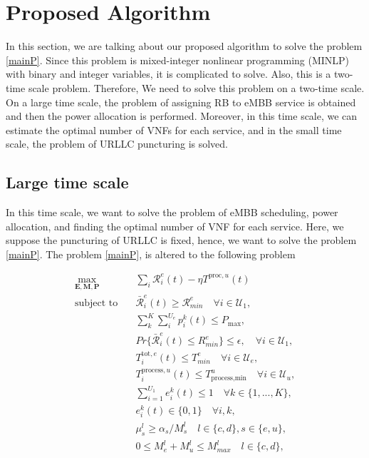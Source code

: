 \documentclass[conference]{IEEEtran}
\begin{document}
\section{Proposed Algorithm}
In this section, we are talking about our proposed algorithm to solve the problem \eqref{mainP}.
Since this problem is mixed-integer nonlinear programming (MINLP) with binary and integer variables, it is complicated to solve. Also, this is a two-time scale problem.
Therefore, We need to solve this problem on a two-time scale. On a large time scale, the problem of assigning RB to eMBB service is obtained and then the power allocation is performed. 
Moreover, in this time scale, we can estimate the optimal number of VNFs for each service, and in the small time scale, the problem of URLLC puncturing is solved. 
\subsection{Large time scale}
In this time scale, we want to solve the problem of eMBB scheduling, power allocation, and finding the optimal number of VNF for each service.
Here, we suppose the puncturing of URLLC is fixed, hence, we want to solve the problem \eqref{mainP}.
The problem \eqref{mainP}, is altered to the following problem


\begin{subequations} \label{mainP1}
\begin{alignat}{4}
\max\limits_{ \boldsymbol{E},\boldsymbol{M}, \boldsymbol{P}} &  \sum_i {\mathcal{R}}_{i}^e(t) - \eta T^{\text{proc}, u}(t)       \ \\
\text{subject to} \quad  & \bar{\mathcal{R}}_{i}^e(t) \geq  \mathcal{R}_{min}^e \quad \forall i \in \mathcal{U}_1, \label{p11} \\
& \sum_k^K \sum_i^{U_e} p^k_i(t) \leq P_{\text{max}},  \label{p11-1} \\
& Pr\{\bar{\mathcal{R}}_{i}^e(t) \leq {R}_{min}^e\}  \leq \epsilon,\quad \forall i \in \mathcal{U}_1, \label{p12}\\
&T^{\text{tot}, e}_i(t)  \leq T_{min}^e  \quad \forall i \in \mathcal{U}_e, \label{p12-1} \\
&T^{\text{process}, u}_i(t)  \leq T_{\text{process,min}}^u  \quad \forall i \in \mathcal{U}_u, \label{p12-2} \\
&\sum_{i=1}^{U_1}e^k_i(t)\leq 1 \quad \forall k \in \{1,...,K\},\label{p15} \\
&e^k_i(t)\in \{0,1\}  \quad \forall i,k, \label{p16} \\
& \mu^l_s \geq \alpha_s/M^l_s \quad l \in \{c,d\}, s\in\{e,u\},\label{p18} \\
& 0 \leq M^l_e  + M^l_u \leq M_{max}^l  \quad l \in \{c,d\},\label{p110}
\end{alignat}
\label{constraints}
\end{subequations}
\end{document}

